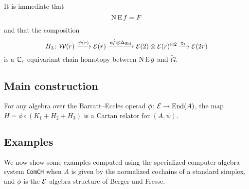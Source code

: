 It is immediate that
\[
\operatorname{N}\operatorname{E} f = F
\]
and that the composition
\[
H_3 \colon \mathcal{W}(r) \xrightarrow{\psi(r)} \mathcal{E}(r) \xrightarrow{\psi^2_0 \otimes \Delta_{\operatorname{Shi}}} \mathcal{E}(2) \otimes \mathcal{E}(r)^{\otimes 2} \xrightarrow{\bm{\circ}_{\mathcal{E}}} \mathcal{E}(2r)
\]
is a $\mathbb{C}_r$-equivariant chain homotopy between $\operatorname{N}\operatorname{E} g$ and $\widetilde G$.


\subsection{Main construction}

\begin{theorem}
	For any algebra over the Barratt--Eccles operad $\phi \colon \mathcal{E} \to \mathrm{End}(A)$, the map $H = \phi \circ (K_1 + H_2 + H_3)$ is a Cartan relator for $(A,\psi)$.
\end{theorem}

\subsection{Examples}

We now show some examples computed using the specialized computer algebra system \texttt{ComCH} \cite{medina2021comch} when $A$ is given by the normalized cochains of a standard simplex, and $\phi$ is the $\mathcal{E}$-algebra structure of Berger and Fresse.

